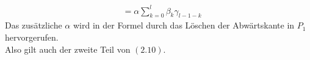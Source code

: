 \documentclass[a4paper, 11pt]{scrreprt}
\begin{document}
\begin{itemize}
\begin{equation}
\begin{split}
		&=\alpha\sum_{k=0}^l \beta_k\gamma_{l-1-k}
	\end{split}
\end{equation}
Das zusätzliche \(\alpha\) wird in der Formel durch das Löschen der Abwärtskante in \(P_1\) hervorgerufen.\\
Also gilt auch der zweite Teil von \((2.10)\).

\end{itemize}
\end{document}
